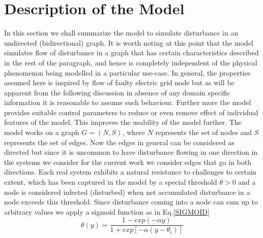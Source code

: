 \documentclass[11pt]{article}
\begin{document}
\section{Description of the Model}
In this section we shall summarize the model to simulate disturbance in an undirected (bidirectional) graph. It is worth noting at this point that the model simulates flow of disturbance in a graph that has certain characteristics described in the rest of the paragraph, and hence is completely independent of the physical phenomenon being modelled in a particular use-case. In general, the properties assumed here is inspired by flow of faulty electric grid node but as will be apparent from the following discussion in absence of any domain specific information it is reasonable to assume such behaviour. Further more the model provides suitable control parameters to reduce or even remove effect of individual features of the model. This improves the usability of the model further. The model works on a graph $G = (N, S)$, where $N$ represents the set of nodes and $S$ represents the set of edges. Now the edges in general can be considered as directed but since it is uncommon to have disturbance flowing in one direction in the systems we consider for the current work we consider edges that go in both directions. Each real system exhibits a natural resistance to challenges to certain extent, which has been captured in the model by a special threshold $\theta > 0$ and a node is considered infected (disturbed) when net accumulated disturbance in a node exceeds this threshold. Since disturbance coming into a node can sum up to arbitrary values we apply a sigmoid function as in Eq.\ref{SIGMOID}
\begin{equation}
\theta(y) = \frac{1-exp(-\alpha y)}{1+exp[-\alpha(y-\theta_i)]} 
\label{SIGMOID}
\end{equation}\\
\end{document}

